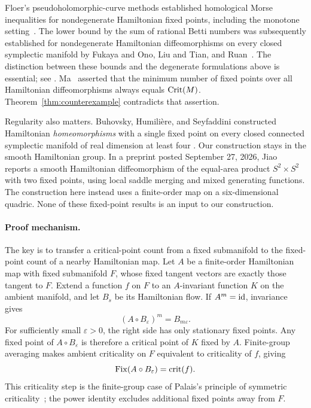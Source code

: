 Floer's pseudoholomorphic-curve methods established homological Morse
inequalities for nondegenerate Hamiltonian fixed points, including the
monotone setting~\cite{Floer1989}. The lower bound by the sum of rational
Betti numbers was subsequently established for nondegenerate Hamiltonian
diffeomorphisms on every closed symplectic manifold by Fukaya and Ono,
Liu and Tian, and Ruan~\cite{FukayaOno1999,LiuTian1998,Ruan1999}.
The distinction between these bounds
and the degenerate formulations above is essential; see
\cite[Theorem~1.3 and Conjectures~1.4 and~1.6]{Golovko2020}.
Ma~\cite[Theorem~1.5]{Ma2013} asserted that the minimum number of fixed
points over all Hamiltonian diffeomorphisms always equals $\operatorname{Crit}(M)$.
Theorem~\ref{thm:counterexample} contradicts that assertion.

Regularity also matters. Buhovsky, Humili\`ere, and Seyfaddini constructed
Hamiltonian \emph{homeomorphisms} with a single fixed point on every closed
connected symplectic manifold of real dimension at least four
\cite{BHS2018}. Our construction stays in the smooth Hamiltonian group.
In a preprint posted September 27, 2026, Jiao~\cite[Theorem~1.1]{Jiao2026}
reports a smooth Hamiltonian diffeomorphism of the equal-area product
$S^2\times S^2$ with two fixed points, using local saddle merging and
mixed generating functions. The construction here instead uses a
finite-order map on a six-dimensional quadric. None of these
fixed-point results is an input to our construction.

\paragraph{Proof mechanism.}
The key is to transfer a critical-point count from a fixed submanifold
to the fixed-point count of a nearby Hamiltonian map. Let $A$ be a
finite-order Hamiltonian map with fixed submanifold $F$, whose fixed
tangent vectors are exactly those tangent to $F$. Extend a function
$f$ on $F$ to an $A$-invariant function $K$ on the ambient manifold,
and let $B_s$ be its Hamiltonian flow. If $A^m=\mathrm{id}$, invariance gives
\[
 (A\circ B_\varepsilon)^m=B_{m\varepsilon}.
\]
For sufficiently small $\varepsilon>0$, the right side has only
stationary fixed points. Any fixed point of $A\circ B_\varepsilon$
is therefore a critical point of $K$ fixed by $A$. Finite-group
averaging makes ambient criticality on $F$ equivalent to criticality
of $f$, giving
\[
 \operatorname{Fix}(A\circ B_\varepsilon)=\operatorname{crit}(f).
\]
This criticality step is the finite-group case of Palais's principle
of symmetric criticality~\cite[Section~5]{Palais1979}; the power identity
excludes additional fixed points away from $F$.

